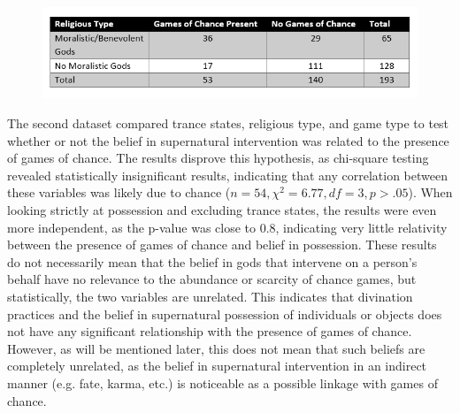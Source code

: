 \documentclass[%
	]{ijsra}
\begin{document}
\begin{figure}[!htb] %
	\includegraphics[width=\linewidth]{figures/Davis-Table02}
	\centering
	\label{fig:Davis-Table02}
\end{figure}


The second dataset compared trance states, religious type, and game type to test whether or not the belief in supernatural intervention was related to the presence of games of chance. The results disprove this hypothesis, as chi-square testing revealed statistically insignificant results, indicating that any correlation between these variables was likely due to chance ($n = 54, \chi^{2} = 6.77, df = 3, p > .05$).  When looking strictly at possession and excluding trance states, the results were even more independent, as the p-value was close to 0.8, indicating very little relativity between the presence of games of chance and belief in possession. These results do not necessarily mean that the belief in gods that intervene on a person’s behalf have no relevance to the abundance or scarcity of chance games, but statistically, the two variables are unrelated. This indicates that divination practices and the belief in supernatural possession of individuals or objects does not have any significant relationship with the presence of games of chance. However, as will be mentioned later, this does not mean that such beliefs are completely unrelated, as the belief in supernatural intervention in an indirect manner (e.g. fate, karma, etc.) is noticeable as a possible linkage with games of chance.

\end{document}
